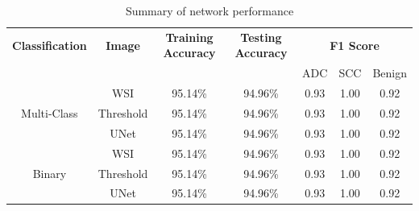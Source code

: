 \documentclass{comjnl}
\begin{document}
\begin{table} 
\begin{center}
\begin{tabular}[scale=2.0]{ |c|c|c|c|c|c|c| }
  \hline
  \textbf{Classification}&\textbf{Image}&\textbf{Training Accuracy}&\textbf{Testing Accuracy}&\multicolumn{3}{c|}{\textbf{F1 Score}}\\\cline{5-7}
  &&&&ADC&SCC&Benign\\
  \hline
  
  \multirow{3}{*}{Multi-Class}&WSI&95.14\%&94.96\%&0.93&1.00&0.92\\\cline{2-7}
  &Threshold&95.14\%&94.96\%&0.93&1.00&0.92\\\cline{2-7}
  &UNet&95.14\%&94.96\%&0.93&1.00&0.92\\
  \hline
  
  \multirow{3}{*}{Binary}&WSI&95.14\%&94.96\%&0.93&1.00&0.92\\\cline{2-7}
  &Threshold&95.14\%&94.96\%&0.93&1.00&0.92\\\cline{2-7}
  &UNet&95.14\%&94.96\%&0.93&1.00&0.92\\
  \hline
  
\end{tabular}
\caption{Summary of network performance}
\label{metrics_summary}
\end{center}
\end{table} 

   
  
\end{document}
